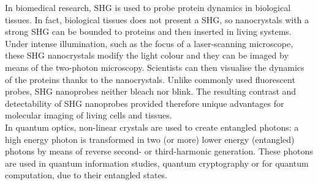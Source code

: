 In biomedical research, SHG is used to probe protein dynamics in biological tissues. In fact,  biological tissues does not present a SHG, so nanocrystals with a strong SHG can be bounded to proteins and then inserted in living systems. Under intense illumination, such as the focus of a laser-scanning microscope, these SHG nanocrystals modify the light colour and they can be imaged by means of the two-photon microscopy. Scientists can then visualise the dynamics of the proteins thanks to the nanocrystals. Unlike commonly used fluorescent probes, SHG nanoprobes neither bleach nor blink. The resulting contrast and detectability of SHG nanoprobes provided therefore unique advantages for molecular imaging of living cells and tissues. \cite{pantazis2010second}\\
%

In quantum optics, non-linear crystals are used to create entangled photons: a high energy photon is transformed in two (or more) lower energy (entangled) photons by means of reverse second- or third-harmonic generation. These photons are used in quantum information studies, quantum cryptography or for quantum computation, due to their entangled states.\cite{PhysRevLett.75.4337}\\ 

